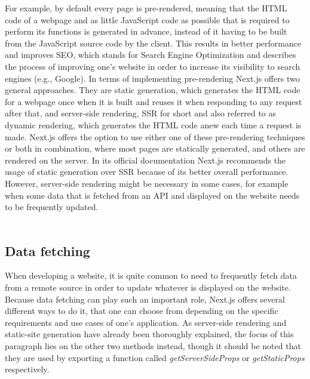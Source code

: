 For example, by default every page is pre-rendered, meaning that the HTML code of a webpage and as little JavaScript code as possible
that is required to perform its functions is generated in advance, instead of it having to be built from the JavaScript source code by
the client. This results in better performance and improves SEO, which stands for Search Engine Optimization and describes the process
of improving one's website in order to increase its visibility to search engines (e.g., Google). In terms of implementing pre-rendering
Next.js offers two general approaches. They are static generation, which generates the HTML code for a webpage once when it is built
and reuses it when responding to any request after that, and server-side rendering, SSR for short and also referred to as dynamic
rendering, which generates the HTML code anew each time a request is made. Next.js offers the option to use either one of these pre-rendering
techniques or both in combination, where most pages are statically generated, and others are rendered on the server. In its official
documentation Next.js recommends the usage of static generation over SSR because of its better overall performance. However, server-side
rendering might be necessary in some cases, for example when some data that is fetched from an API and displayed on the website needs
to be frequently updated.
\\
\\
\subsection{Data fetching}
When developing a website, it is quite common to need to frequently fetch data from a remote source in order to update whatever is displayed
on the website. Because data fetching can play such an important role, Next.js offers several different ways to do it, that one can choose
from depending on the specific requirements and use cases of one's application. As server-side rendering and static-site generation have already
been thoroughly explained, the focus of this paragraph lies on the other two methods instead, though it should be noted that they are used by
exporting a function called \emph{getServerSideProps} or \emph{getStaticProps} respectively.

